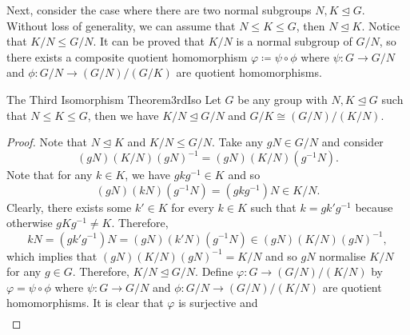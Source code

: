 \documentclass[math]{amznotes}
\theoremstyle{remark}
\newcommand{\0}{\mathbf{0}}
\newcommand{\1}{\mathbf{1}}
\begin{document}
Next, consider the case where there are two normal subgroups $N, K \trianglelefteq G$. Without loss of generality, we can assume that $N \leq K \leq G$, then $N \trianglelefteq K$. Notice that $K \slash N \leq G \slash N$. It can be proved that $K \slash N$ is a normal subgroup of $G \slash N$, so there exists a composite quotient homomorphism $\varphi \coloneqq \psi \circ \phi$ where $\psi \colon G \to G \slash N$ and $\phi \colon G \slash N \to \left(G \slash N\right) \slash \left(G \slash K\right)$ are quotient homomorphisms.
\begin{thmbox}{The Third Isomorphism Theorem}{3rdIso}
    Let $G$ be any group with $N, K \trianglelefteq G$ such that $N \leq K \leq G$, then we have $K \slash N \trianglelefteq G \slash N$ and $G \slash K \cong \left(G \slash N\right) \slash \left(K \slash N\right)$.
    \tcblower
    \begin{proof}
        Note that $N \trianglelefteq K$ and $K \slash N \leq G \slash N$. Take any $gN \in G \slash N$ and consider 
        \begin{equation*}
            \left(gN\right)\left(K \slash N\right)\left(gN\right)^{-1} = \left(gN\right)\left(K \slash N\right)\left(g^{-1}N\right).
        \end{equation*}
        Note that for any $k \in K$, we have $gkg^{-1} \in K$ and so
        \begin{equation*}
            \left(gN\right)\left(kN\right)\left(g^{-1}N\right) = \left(gkg^{-1}\right)N \in K \slash N.
        \end{equation*}
        Clearly, there exists some $k' \in K$ for every $k \in K$ such that $k = gk'g^{-1}$ because otherwise $gKg^{-1} \neq K$. Therefore, 
        \begin{equation*}
            kN = \left(gk'g^{-1}\right)N = \left(gN\right)\left(k'N\right)\left(g^{-1}N\right) \in \left(gN\right)\left(K \slash N\right)\left(gN\right)^{-1},
        \end{equation*}
        which implies that $\left(gN\right)\left(K \slash N\right)\left(gN\right)^{-1} = K \slash N$ and so $gN$ normalise $K \slash N$ for any $g \in G$. Therefore, $K \slash N \trianglelefteq G \slash N$. Define $\varphi \colon G \to \left(G \slash N\right) \slash \left(K \slash N\right)$ by $\varphi = \psi \circ \phi$ where $\psi \colon G \to G \slash N$ and $\phi \colon G \slash N \to \left(G \slash N\right) \slash \left(K \slash N\right)$ are quotient homomorphisms. It is clear that $\varphi$ is surjective and 
        \begin{align*}

\end{align*}
\end{proof}
\end{thmbox}
\end{document}
